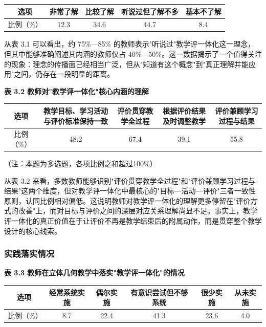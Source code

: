 \documentclass[UTF8,a4paper,12pt,twoside]{ctexart}
\begin{document}
\begin{center}
\begin{tabular}{|c|c|c|c|c|}
\hline
选项 & 非常了解 & 比较了解 & 听说过但了解不多 & 基本不了解 \\
\hline
比例（\%） & 12.3 & 34.6 & 44.7 & 8.4 \\
\hline
\end{tabular}
\end{center}

从表 3.1 可以看出，约 75\%—85\% 的教师表示"听说过"教学评一体化这一理念，但其中能够准确阐述其内涵的教师仅占 40\%—50\%。这一数据揭示了一个值得关注的现象：理念的传播面已经相当广泛，但从"知道有这个概念"到"真正理解并能应用"之间，仍存在一段明显的距离。

\textbf{表 3.2 教师对"教学评一体化"核心内涵的理解}

\begin{center}
\begin{tabular}{|c|c|c|c|c|}
\hline
选项 & 教学目标、学习活动与评价标准保持一致 & 评价贯穿教学全过程 & 根据评价结果及时调整教学 & 评价兼顾学习过程与结果 \\
\hline
比例（\%） & 48.2 & 67.4 & 39.1 & 55.8 \\
\hline
\end{tabular}
\end{center}

（注：本题为多选题，各项比例之和超过100\%）

从表 3.2 来看，多数教师能够识别"评价贯穿教学全过程"和"评价兼顾学习过程与结果"这两个维度，但对教学评一体化中最核心的"目标—活动—评价"三者一致性原则，认同比例相对偏低。这说明教师对教学评一体化的理解更多停留在"评价方式的改善"上，而对目标与评价之间的深层对应关系理解尚显不足。事实上，教学评一体化的真正价值在于让评价不再是教学结束后的附属动作，而是贯穿整个教学设计的核心线索。

\subsubsection{实践落实情况}

\textbf{表 3.3 教师在立体几何教学中落实"教学评一体化"的情况}

\begin{center}
\begin{tabular}{|c|c|c|c|c|c|}
\hline
选项 & 经常系统实施 & 偶尔实施 & 有意识尝试但不够系统 & 很少实施 & 从未实施 \\
\hline
比例（\%） & 8.7 & 22.4 & 41.3 & 23.6 & 4.0 \\
\hline
\end{tabular}
\end{center}
\end{document}
